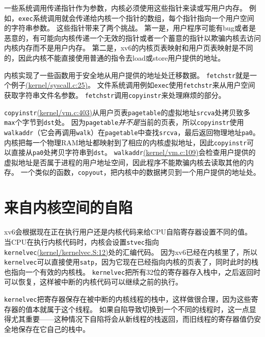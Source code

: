 一些系统调用传递指针作为参数，内核必须使用这些指针来读或写用户内存。
例如，\texttt{exec}系统调用就会传递给内核一个指针的数组，每个指针指向一个用户空间的字符串参数。
这些指针带来了两个挑战。
第一是，用户程序可能有bug或者是恶意的，有可能向内核传递一个无效的指针或者一个蓄意的指针以欺骗内核去访问内核内存而不是用户内存。
第二是，xv6的内核页表映射和用户页表映射是不同的，因此内核不能直接使用普通的指令去load或store用户提供的地址。

内核实现了一些函数用于安全地从用户提供的地址处迁移数据。
\texttt{fetchstr}就是一个例子\href{https://github.com/mit-pdos/xv6-riscv/blob/riscv//kernel/syscall.c#L25}{(kernel/syscall.c:25)}。
文件系统调用例如\texttt{exec}使用\texttt{fetchstr}来从用户空间获取字符串文件名参数。
\texttt{fetchstr}调用\texttt{copyinstr}来处理麻烦的部分。

\texttt{copyinstr}\href{https://github.com/mit-pdos/xv6-riscv/blob/riscv//kernel/vm.c#L403}{(kernel/vm.c:403)}从用户页表\texttt{pagetable}的虚拟地址\texttt{srcva}处拷贝致多\texttt{max}个字节到\texttt{dst}处。
因为\texttt{pagetable}\emph{并不是}当前的页表，所以\texttt{copyinstr}使用\texttt{walkaddr}（它会再调用\texttt{walk}）在\texttt{pagetable}中查找\texttt{srcva}，最后返回物理地址\texttt{pa0}。
内核把每一个物理RAM地址都映射到了相应的内核虚拟地址，因此\texttt{copyinstr}可以直接从\texttt{pa0}处拷贝字符串到\texttt{dst}。
\texttt{walkaddr}\href{https://github.com/mit-pdos/xv6-riscv/blob/riscv//kernel/vm.c#L109}{(kernel/vm.c:109)}会检查用户提供的虚拟地址是否属于进程的用户地址空间，因此程序不能欺骗内核去读取其他的内存。
一个类似的函数，\texttt{copyout}，把内核中的数据拷贝到一个用户提供的地址处。

\section{来自内核空间的自陷}\label{s4-5}
xv6会根据现在正在执行用户还是内核代码来给CPU自陷寄存器设置不同的值。
当CPU在执行内核代码时，内核会设置\texttt{stvec}指向\texttt{kernelvec}\href{https://github.com/mit-pdos/xv6-riscv/blob/riscv//kernel/kernelvec.S#L12}{(kernel/kernelvec.S:12)}处的汇编代码。
因为xv6已经在内核里了，所以\texttt{kernelvec}可以直接使用\texttt{satp}，因为它现在已经指向内核的页表了，同时此时的栈也指向一个有效的内核栈。
\texttt{kernelvec}把所有32位的寄存器存入栈中，之后返回时可以恢复，这样被中断的内核代码可以继续之前的执行。

\texttt{kernelvec}把寄存器保存在被中断的内核线程的栈中，这样做很合理，因为这些寄存器的值本就属于这个线程。
如果自陷导致切换到一个不同的线程时，这一点显得尤其重要——这种情况下自陷将会从新线程的栈返回，而旧线程的寄存器值仍安全地保存在它自己的栈中。


